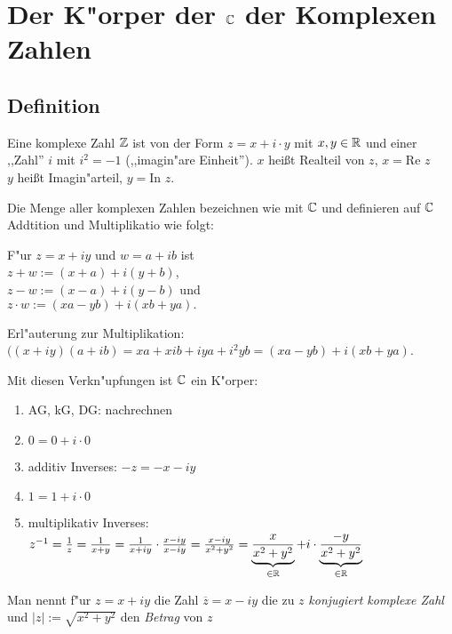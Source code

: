 \section{Der K"orper der $\mathbb{C}$ der Komplexen Zahlen} 
\subsection{Definition}
Eine komplexe Zahl $\mathbb{Z}$ ist von der Form $z=x+i\cdot y$ mit $x, y \in \mathbb{R}$ und einer ,,Zahl'' $i$ mit $i^2=-1$ (,,imagin"are Einheit''). $x$ heißt Realteil von $z$, $x=$Re $z$\\
$y$ heißt Imagin"arteil, $y=$In $z$.

Die Menge aller komplexen Zahlen bezeichnen wie mit $\mathbb{C}$ und definieren auf $\mathbb{C}$ Addtition und Multiplikatio wie folgt:

F"ur $z=x+iy$ und $w=a+ib$ ist \\$z+w:= (x+a) + i (y+b)$, \\$z-w:= (x-a) + i (y-b)$ und \\$z\cdot w:= (xa-yb) + i(xb+ya).$

Erl"auterung zur Multiplikation: $((x+iy)(a+ib) = xa + xib + iya + i^2yb = (xa-yb) + i(xb+ya)$.

Mit diesen Verkn"upfungen ist $\mathbb{C}$ ein K"orper:
\begin{enumerate}
	\item
	AG, kG, DG: nachrechnen
	\item
	$0=0+i\cdot 0$
	\item
	additiv Inverses: $-z = -x-iy$
	\item
	$1=1+i\cdot 0$
	\item
	multiplikativ Inverses: $z^{-1}= \frac{1}{z}= \frac{1}{x+y}=\frac{1}{x+iy}\cdot\frac{x-iy}{x-iy}= \frac{x-iy}{x^2+y^2}=\underbrace{\frac{x}{x^2+y^2}}_{\in \mathbb{R}}+ i \cdot \underbrace{\frac{-y}{x^2+y^2}}_{\in \mathbb{R}}$
\end{enumerate}
	Man nennt f"ur $z=x+iy$ die Zahl $ \overline{z} = x-iy$ die zu $z$ \emph{konjugiert komplexe Zahl} und $|z| := \sqrt{x^2+y^2}$ den \emph{Betrag} von $z$

